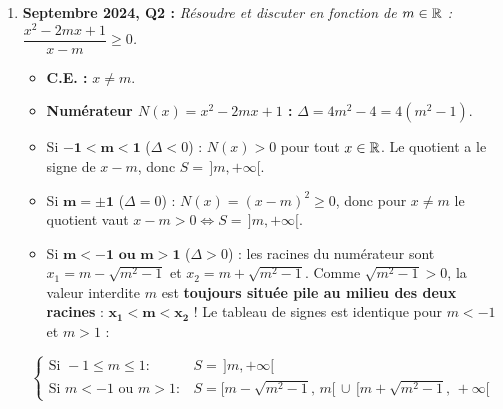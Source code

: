 \begin{exemple}
\begin{enumerate}
    \item \textbf{Septembre 2024, Q2 :} \emph{Résoudre et discuter en fonction de $m \in \mathbb{R}$ : $\dfrac{x^2 - 2mx + 1}{x - m} \ge 0$.}\\
    \begin{itemize}
        \item \textbf{C.E. :} $x \neq m$.
        \item \textbf{Numérateur $N(x) = x^2 - 2mx + 1$ :} $\Delta = 4m^2 - 4 = 4(m^2 - 1)$.
        \item Si $\mathbf{-1 < m < 1}$ ($\Delta < 0$) : $N(x) > 0$ pour tout $x \in \mathbb{R}$. Le quotient a le signe de $x - m$, donc $S = \,]m, +\infty[$.
        \item Si $\mathbf{m = \pm 1}$ ($\Delta = 0$) : $N(x) = (x - m)^2 \ge 0$, donc pour $x \neq m$ le quotient vaut $x - m > 0 \iff S = \,]m, +\infty[$.
        \item Si $\mathbf{m < -1 \text{ ou } m > 1}$ ($\Delta > 0$) : les racines du numérateur sont $x_1 = m - \sqrt{m^2 - 1}$ et $x_2 = m + \sqrt{m^2 - 1}$. Comme $\sqrt{m^2 - 1} > 0$, la valeur interdite $m$ est \textbf{toujours située pile au milieu des deux racines} : $\mathbf{x_1 < m < x_2}$ ! Le tableau de signes est identique pour $m < -1$ et $m > 1$ :
    \end{itemize}
    \[
        \boxed{\begin{cases}
            \text{Si } -1 \le m \le 1 : & S = \,]m, +\infty[ \\
            \text{Si } m < -1 \text{ ou } m > 1 : & S = \bigl[m - \sqrt{m^2 - 1},\, m\bigr[ \,\cup\, \bigl[m + \sqrt{m^2 - 1},\, +\infty\bigr[
        \end{cases}}
    \]


\end{enumerate}
\end{exemple}
